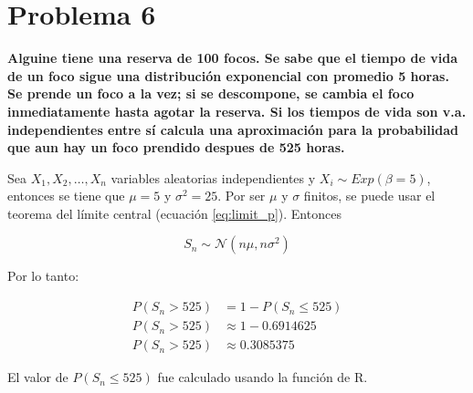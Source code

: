 \section*{Problema 6}

\textbf{Alguine tiene una reserva de 100 focos. Se sabe que el tiempo de vida de un foco sigue una distribución exponencial con promedio 5 horas. Se prende un foco a la vez; si se descompone, se cambia el foco inmediatamente hasta agotar la reserva. Si los tiempos de vida son v.a. independientes entre sí calcula una aproximación para la probabilidad que aun hay un foco prendido despues de 525 horas.}

Sea $X_1,X_2,\dots, X_n$ variables aleatorias independientes y $X_i \sim Exp(\beta=5)$, entonces se tiene que $\mu = 5$ y $\sigma^2 = 25$. Por ser $\mu$ y $\sigma$ finitos, se puede usar el teorema del límite central (ecuación \ref{eq:limit_p}). Entonces

\begin{equation*}
    S_n \sim \mathcal{N}(n\mu,n\sigma^2)
\end{equation*}

Por lo tanto:

\begin{align*}
    P(S_n > 525) & = 1 -P(S_n \leq 525)  \\
    P(S_n > 525) & \approx 1 - 0.6914625 \\
    P(S_n > 525) & \approx 0.3085375
\end{align*}

El valor de $P(S_n \leq 525)$ fue calculado usando la función  de R.
